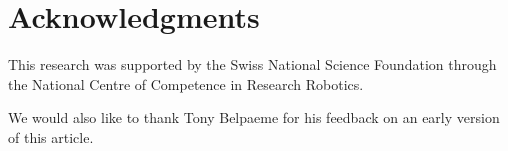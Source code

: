 \documentclass{sig-alternate}
\begin{document}

\section*{Acknowledgments}

This research was supported by the Swiss National Science Foundation through the
National Centre of Competence in Research Robotics.

We would also like to thank Tony Belpaeme for his feedback on an early version
of this article.


\addtolength{\textheight}{-5cm}



\end{document}
